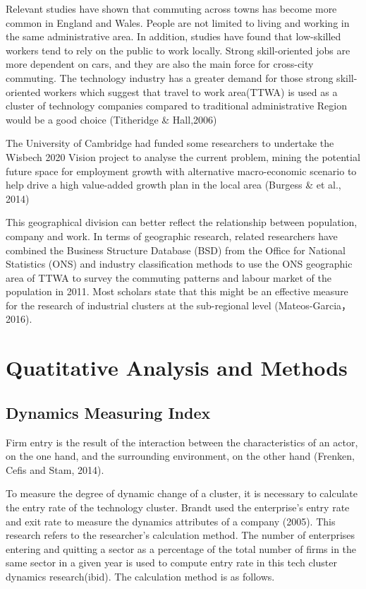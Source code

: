 \documentclass[
  12pt,
  oneside]{book}
\begin{document}
Relevant studies have shown that commuting across towns has become more common in England and Wales. People are not limited to living and working in the same administrative area. In addition, studies have found that low-skilled workers tend to rely on the public to work locally. Strong skill-oriented jobs are more dependent on cars, and they are also the main force for cross-city commuting. The technology industry has a greater demand for those strong skill-oriented workers which suggest that travel to work area(TTWA) is used as a cluster of technology companies compared to traditional administrative Region would be a good choice (Titheridge \& Hall,2006)

The University of Cambridge had funded some researchers to undertake the Wisbech 2020 Vision project to analyse the current problem, mining the potential future space for employment growth with alternative macro-economic scenario to help drive a high value-added growth plan in the local area (Burgess \& et al., 2014)

This geographical division can better reflect the relationship between population, company and work. In terms of geographic research, related researchers have combined the Business Structure Database (BSD) from the Office for National Statistics (ONS) and industry classification methods to use the ONS geographic area of TTWA to survey the commuting patterns and labour market of the population in 2011. Most scholars state that this might be an effective measure for the research of industrial clusters at the sub-regional level (Mateos-Garcia，2016).

\hypertarget{quatitative-analysis-and-methods}{%
\section{Quatitative Analysis and Methods}\label{quatitative-analysis-and-methods}}

\hypertarget{dynamics-measuring-index}{%
\subsection{Dynamics Measuring Index}\label{dynamics-measuring-index}}

Firm entry is the result of the interaction between the
characteristics of an actor, on the one hand, and the surrounding environment, on the other hand (Frenken, Cefis and Stam, 2014).

To measure the degree of dynamic change of a cluster, it is necessary to calculate the entry rate of the technology cluster. Brandt used the enterprise's entry rate and exit rate to measure the dynamics attributes of a company (2005). This research refers to the researcher's calculation method. The number of enterprises entering and quitting a sector as a percentage of the total number of firms in the same sector in a given year is used to compute entry rate in this tech cluster dynamics research(ibid). The calculation method is as follows.
\end{document}
